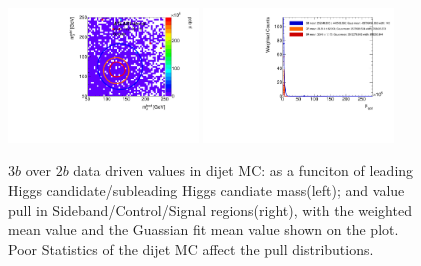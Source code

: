\begin{figure}[htbp!]
\begin{center}
\includegraphics[width=0.45\textwidth,angle=-90]{figures/boosted/AppendixMuqcdstudy/QCD_ThreeTag_Incl_mH0H1.pdf}
\includegraphics[width=0.45\textwidth,angle=-90]{figures/boosted/AppendixMuqcdstudy/QCD_ThreeTag_Incl_mH0H1_pull.pdf}
\caption{$3b$ over $2b$ data driven \muqcd values in dijet MC: \muqcd as a funciton of leading Higgs candidate/subleading Higgs candiate mass(left); and \muqcd value pull in Sideband/Control/Signal regions(right), with the weighted mean value and the Guassian fit mean value shown on the plot. Poor Statistics of the dijet MC affect the pull distributions.}
\label{fig:app-muqcd-3b-qcd}
\end{center}
\end{figure}

